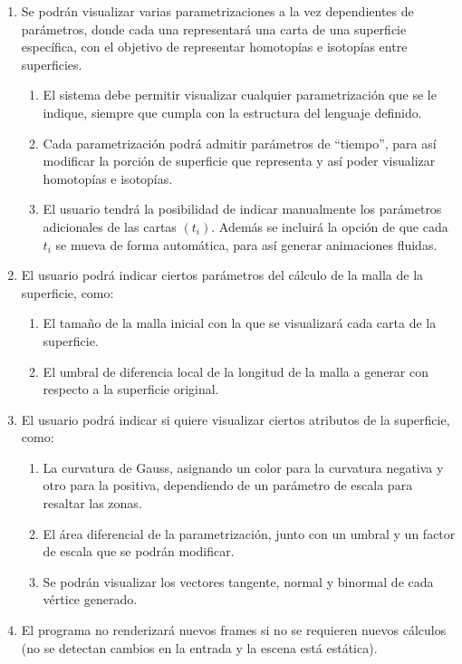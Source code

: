 	\begin{enumerate}
		\item Se podrán visualizar varias parametrizaciones a la vez dependientes de parámetros, donde cada una representará una carta de una superficie específica, con el objetivo de representar homotopías e isotopías entre superficies.
		
		\begin{enumerate}
			\item El sistema debe permitir visualizar cualquier parametrización que se le indique, siempre que cumpla con la estructura del lenguaje definido.
			\item Cada parametrización podrá admitir parámetros de ``tiempo'', para así modificar la porción de superficie que representa y así poder visualizar homotopías e isotopías.
			\item El usuario tendrá la posibilidad de indicar manualmente los parámetros adicionales de las cartas $(t_i)$. Además se incluirá la opción de que cada $t_i$ se mueva de forma automática, para así generar animaciones fluidas.
		\end{enumerate}
		
		\item El usuario podrá indicar ciertos parámetros del cálculo de la malla de la superficie, como:
			\begin{enumerate}
				\item El tamaño de la malla inicial con la que se visualizará cada carta de la superficie.
				\item El umbral de diferencia local de la longitud de la malla a generar con respecto a la superficie original.
			\end{enumerate}
			
		\item El usuario podrá indicar si quiere visualizar ciertos atributos de la superficie, como:
			\begin{enumerate}
				\item La curvatura de Gauss, asignando un color para la curvatura negativa y otro para la positiva, dependiendo de un parámetro de escala para resaltar las zonas.
				\item El área diferencial de la parametrización, junto con un umbral y un factor de escala que se podrán modificar.
				\item Se podrán visualizar los vectores tangente, normal y binormal de cada vértice generado.
			\end{enumerate}
			
		\item El programa no renderizará nuevos frames si no se requieren nuevos cálculos (no se detectan cambios en la entrada y la escena está estática).
	\end{enumerate}

